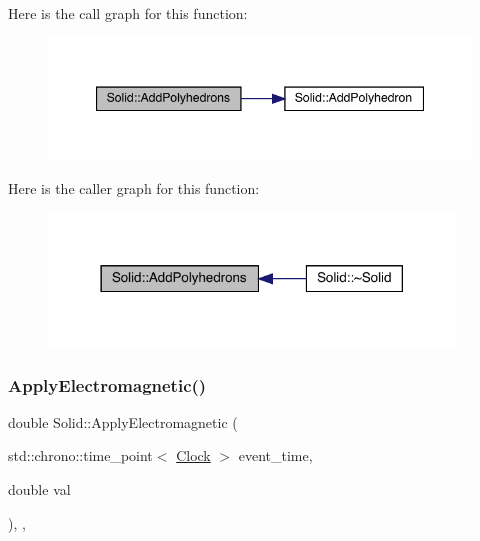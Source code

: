 Here is the call graph for this function\+:
\nopagebreak
\begin{figure}[H]
\begin{center}
\leavevmode
\includegraphics[width=347pt]{class_solid_a649ba1103a9889bc9e45256633dc72c3_cgraph}
\end{center}
\end{figure}
Here is the caller graph for this function\+:
\nopagebreak
\begin{figure}[H]
\begin{center}
\leavevmode
\includegraphics[width=306pt]{class_solid_a649ba1103a9889bc9e45256633dc72c3_icgraph}
\end{center}
\end{figure}
\mbox{\label{class_solid_ab546d607d6f0bf70dc5e6bbac8baf287}} 
\subsubsection{\texorpdfstring{Apply\+Electromagnetic()}{ApplyElectromagnetic()}}
{\footnotesize\ttfamily double Solid\+::\+Apply\+Electromagnetic (\begin{DoxyParamCaption}\item[{std\+::chrono\+::time\+\_\+point$<$ \hyperlink{universe_8h_a0ef8d951d1ca5ab3cfaf7ab4c7a6fd80}{Clock} $>$}]{event\+\_\+time,  }\item[{double}]{val }\end{DoxyParamCaption})\hspace{0.3cm}{\ttfamily [inline]}, {\ttfamily [final]}, {\ttfamily [virtual]}}



